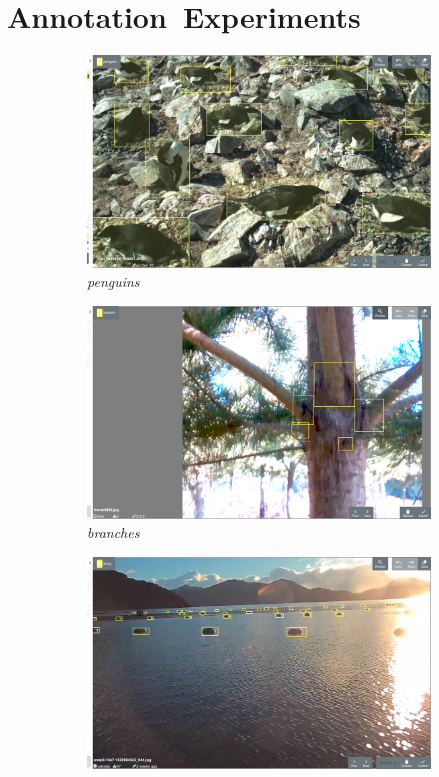 \chapter{Annotation~Experiments}
\label{chap:annotation} 

\begin{figure}[htbp]
\centering
\begin{subfigure}[t]{0.24\linewidth}
  \includegraphics[width=1.0\linewidth]{figures/annotation/screenshots/penguins2.png}
   \caption{\emph{penguins}}
\end{subfigure}%
\begin{subfigure}[t]{0.24\linewidth}
  \includegraphics[width=1.0\linewidth]{figures/annotation/screenshots/branches3.png}
   \caption{\emph{branches}}
\end{subfigure}%
\begin{subfigure}[t]{0.24\linewidth}
  \includegraphics[width=1.0\linewidth]{figures/annotation/screenshots/buoys.png}

\end{subfigure}
\end{figure}
